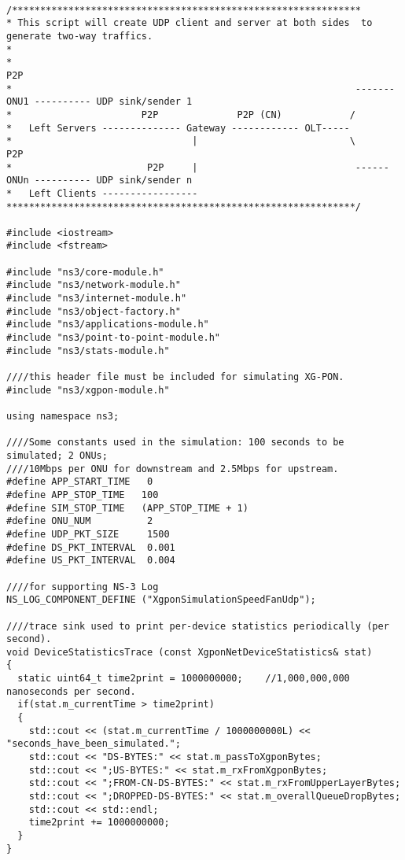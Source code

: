 \begin{lstlisting}

/**************************************************************
* This script will create UDP client and server at both sides  to generate two-way traffics.
*
*                                                                            P2P
*                                                             ------- ONU1 ---------- UDP sink/sender 1
*                       P2P              P2P (CN)            /
*   Left Servers -------------- Gateway ------------ OLT-----
*                                |                           \               P2P
*                        P2P     |                            ------ ONUn ---------- UDP sink/sender n
*   Left Clients -----------------
**************************************************************/

#include <iostream>
#include <fstream>

#include "ns3/core-module.h"
#include "ns3/network-module.h"
#include "ns3/internet-module.h"
#include "ns3/object-factory.h"
#include "ns3/applications-module.h"
#include "ns3/point-to-point-module.h"
#include "ns3/stats-module.h"

////this header file must be included for simulating XG-PON.
#include "ns3/xgpon-module.h"

using namespace ns3;

////Some constants used in the simulation: 100 seconds to be simulated; 2 ONUs;
////10Mbps per ONU for downstream and 2.5Mbps for upstream.
#define APP_START_TIME   0
#define APP_STOP_TIME   100
#define SIM_STOP_TIME   (APP_STOP_TIME + 1)
#define ONU_NUM          2
#define UDP_PKT_SIZE     1500
#define DS_PKT_INTERVAL  0.001
#define US_PKT_INTERVAL  0.004

////for supporting NS-3 Log
NS_LOG_COMPONENT_DEFINE ("XgponSimulationSpeedFanUdp");

////trace sink used to print per-device statistics periodically (per second).
void DeviceStatisticsTrace (const XgponNetDeviceStatistics& stat)
{
  static uint64_t time2print = 1000000000;    //1,000,000,000 nanoseconds per second.
  if(stat.m_currentTime > time2print)
  {
    std::cout << (stat.m_currentTime / 1000000000L) << "seconds_have_been_simulated.";
    std::cout << "DS-BYTES:" << stat.m_passToXgponBytes;
    std::cout << ";US-BYTES:" << stat.m_rxFromXgponBytes;
    std::cout << ";FROM-CN-DS-BYTES:" << stat.m_rxFromUpperLayerBytes;
    std::cout << ";DROPPED-DS-BYTES:" << stat.m_overallQueueDropBytes;
    std::cout << std::endl;
    time2print += 1000000000;
  }
}


\end{lstlisting}
